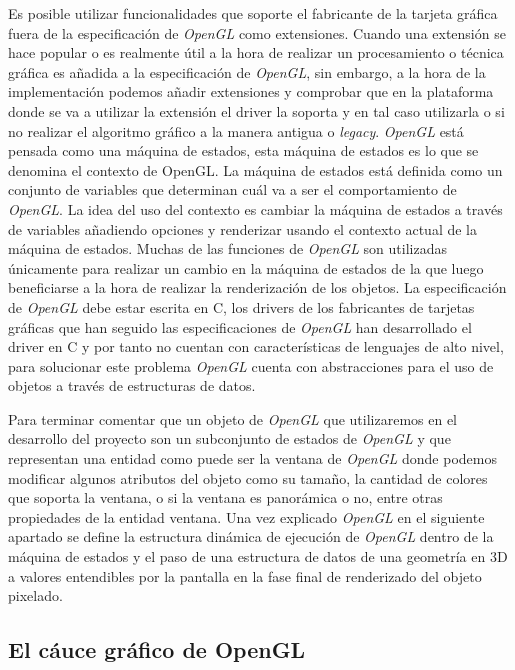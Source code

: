 \documentclass[a4paper]{book}
\begin{document}

Es posible utilizar funcionalidades que soporte el fabricante de la tarjeta gráfica fuera de la especificación de \textit{OpenGL}
como extensiones. Cuando una extensión se hace popular o es realmente útil a la hora de realizar un procesamiento o
técnica gráfica es añadida a la especificación de \textit{OpenGL}, sin embargo, a la hora de la implementación podemos añadir
extensiones y comprobar que en la plataforma donde se va a utilizar la extensión el driver la soporta y en tal caso
utilizarla o si no realizar el algoritmo gráfico a la manera antigua o \textit{legacy}. \textit{OpenGL} está pensada como una máquina de estados, 
esta máquina de estados es lo que se denomina el contexto de OpenGL. La máquina de estados está definida como un conjunto de variables que
determinan cuál va a ser el comportamiento de \textit{OpenGL}. La idea del uso del contexto es cambiar la máquina de estados a través de
variables añadiendo opciones y renderizar usando el contexto actual de la máquina de estados. Muchas de las funciones de
\textit{OpenGL} son utilizadas únicamente para realizar un cambio en la máquina de estados de la que luego beneficiarse a la
hora de realizar la renderización de los objetos. La especificación de \textit{OpenGL} debe estar escrita en C, los drivers de los
fabricantes de tarjetas gráficas que han seguido las especificaciones de \textit{OpenGL} han desarrollado el driver en C y por
tanto no cuentan con características de lenguajes de alto nivel, para solucionar este problema \textit{OpenGL} cuenta con abstracciones
para el uso de objetos a través de estructuras de datos.


Para terminar comentar que un objeto de \textit{OpenGL} que utilizaremos en el desarrollo del proyecto son un subconjunto de estados
de \textit{OpenGL} y que representan una entidad como puede ser la ventana de \textit{OpenGL} donde podemos modificar algunos atributos del
objeto como su tamaño, la cantidad de colores que soporta la ventana, o si la ventana es panorámica o no, entre otras
propiedades de la entidad ventana. Una vez explicado \textit{OpenGL} en el siguiente apartado se define la estructura dinámica de ejecución
de \textit{OpenGL} dentro de la máquina de estados y el paso de una estructura de datos de una geometría en 3D a valores entendibles por
la pantalla en la fase final de renderizado del objeto pixelado. \cite{book:_opengl}

\subsection{El cáuce gráfico de OpenGL}
\label{subsec:CauceOpenGL}
\end{document}
